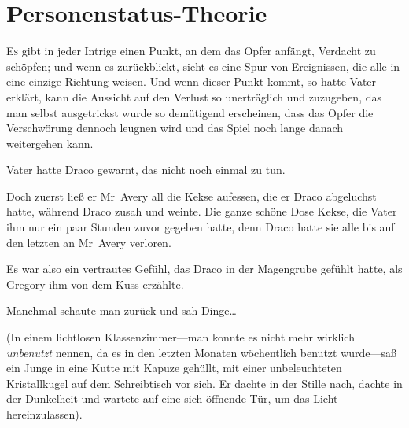 \chapter{Personenstatus-Theorie}

\lettrine{E}{s} gibt in jeder Intrige einen Punkt, an dem das Opfer anfängt, Verdacht zu schöpfen; und wenn es zurückblickt, sieht es eine Spur von Ereignissen, die alle in eine einzige Richtung weisen. Und wenn dieser Punkt kommt, so hatte Vater erklärt, kann die Aussicht auf den Verlust so unerträglich und zuzugeben, das man selbst ausgetrickst wurde so demütigend erscheinen, dass das Opfer die Verschwörung dennoch leugnen wird und das Spiel noch lange danach weitergehen kann.

Vater hatte Draco gewarnt, das nicht noch einmal zu tun.

Doch zuerst ließ er Mr~Avery all die Kekse aufessen, die er Draco abgeluchst hatte, während Draco zusah und weinte. Die ganze schöne Dose Kekse, die Vater ihm nur ein paar Stunden zuvor gegeben hatte, denn Draco hatte sie alle bis auf den letzten an Mr~Avery verloren.

Es war also ein vertrautes Gefühl, das Draco in der Magengrube gefühlt hatte, als Gregory ihm von dem Kuss erzählte.

Manchmal schaute man zurück und sah Dinge…

(In einem lichtlosen Klassenzimmer—man konnte es nicht mehr wirklich \emph{unbenutzt} nennen, da es in den letzten Monaten wöchentlich benutzt wurde—saß ein Junge in eine Kutte mit Kapuze gehüllt, mit einer unbeleuchteten Kristallkugel auf dem Schreibtisch vor sich. Er dachte in der Stille nach, dachte in der Dunkelheit und wartete auf eine sich öffnende Tür, um das Licht hereinzulassen).

